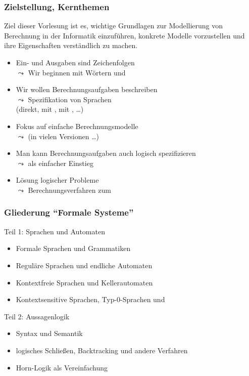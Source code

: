 \documentclass[onlymath]{beamer}
\begin{document}
\begin{frame}\frametitle{Zielstellung, Kernthemen}

Ziel dieser Vorlesung ist es, wichtige Grundlagen zur \alert{Modellierung von Berechnung}
in der Informatik einzuführen, \alert{konkrete Modelle} vorzustellen und ihre \alert{Eigenschaften verständlich zu machen}.
\medskip

\begin{itemize}
\item Ein- und Ausgaben sind Zeichenfolgen\\
$\leadsto$ Wir beginnen mit Wörtern und 
%
\item Wir wollen Berechnungsaufgaben beschreiben\\
$\leadsto$ Spezifikation von Sprachen\\
\hspace{1em} (direkt, mit , mit , \ldots)
%
\item Fokus auf einfache Berechnungsmodelle\\
$\leadsto$  (in vielen Versionen \ldots)
%
\item Man kann Berechnungsaufgaben auch logisch spezifizieren\\
$\leadsto$  als einfacher Einstieg
%
\item Lösung logischer Probleme\\
$\leadsto$ Berechnungsverfahren zum 
\end{itemize}

\end{frame}


\begin{frame}\frametitle{Gliederung "`Formale Systeme"'}

\alert{Teil 1: Sprachen und Automaten}
\begin{itemize}
\item Formale Sprachen und Grammatiken
\item Reguläre Sprachen und endliche Automaten
\item Kontextfreie Sprachen und Kellerautomaten
\item Kontextsensitive Sprachen, Typ-0-Sprachen und 
\end{itemize}
\bigskip

\alert{Teil 2: Aussagenlogik}
\begin{itemize}
\item Syntax und Semantik
\item logisches Schließen, Backtracking und andere Verfahren
\item Horn-Logik als Vereinfachung
\end{itemize}

\end{frame}
\end{document}
